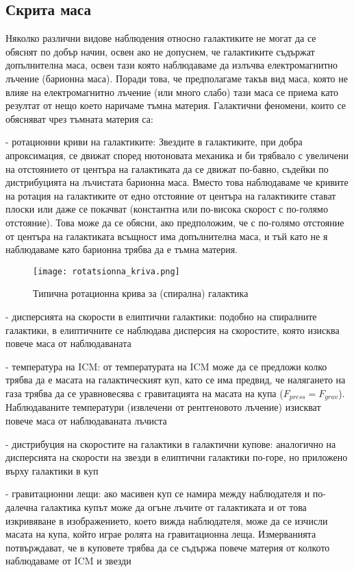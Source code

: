 \documentclass[a4paper,12pt]{article}
\begin{document}
\subsection{Скрита маса}
Няколко различни видове наблюдения относно галактиките не могат да се обяснят по добър начин, освен ако не допуснем, че галактиките съдържат допълнителна маса, освен тази която наблюдаваме да излъчва електромагнитно лъчение (барионна маса). Поради това, че предполагаме такъв вид маса, която не влияе на електромагнитно лъчение (или много слабо) тази маса се приема като резултат от нещо което наричаме тъмна материя. Галактични феномени, които се обясняват чрез тъмната материя са:

- ротационни криви на галактиките: Звездите в галактиките, при добра апроксимация, се движат според нютоновата механика и би трябвало с увеличени на отстоянието от центъра на галактиката да се движат по-бавно, съдейки по дистрибуцията на лъчистата барионна маса. Вместо това наблюдаваме че кривите на ротация на галактиките от едно отстояние от центъра на галактиките стават плоски или даже се покачват (константна или по-висока скорост с по-голямо отстояние). Това може да се обясни, ако предположим, че с по-голямо отстояние от центъра на галактиката всъщност има допълнителна маса, и тъй като не я наблюдаваме като барионна трябва да е тъмна материя.


\begin{figure}[h!] %
\centering
\texttt{[image: rotatsionna\_kriva.png]}
\caption{Типична ротационна крива за (спирална) галактика}
\label{fig:rotatsionna_kriva}
\end{figure}


- дисперсията на скорости в елиптични галактики: подобно на спиралните галактики, в елиптичните се наблюдава дисперсия на скоростите, която изисква повече маса от наблюдаваната

- температура на ICM: от температурата на ICM може да се предложи колко трябва да е масата на галактическият куп, като се има предвид, че налягането на газа трябва да се уравновесява с гравитацията на масата на купа ($F_{press}=F_{grav}$). Наблюдаваните температури (извлечени от рентгеновото лъчение) изискват повече маса от наблюдаваната лъчиста

- дистрибуция на скоростите на галактики в галактични купове: аналогично на дисперсията на скорости на звезди в елиптични галактики по-горе, но приложено върху галактики в куп

- гравитационни лещи: ако масивен куп се намира между наблюдателя и по-далечна галактика купът може да огъне лъчите от галактиката и от това изкривяване в изображението, което вижда наблюдателя, може да се изчисли масата на купа, който играе ролята на гравитационна леща. Измерванията потвърждават, че в куповете трябва да се съдържа повече материя от колкото наблюдаваме от ICM и звезди
\end{document}
